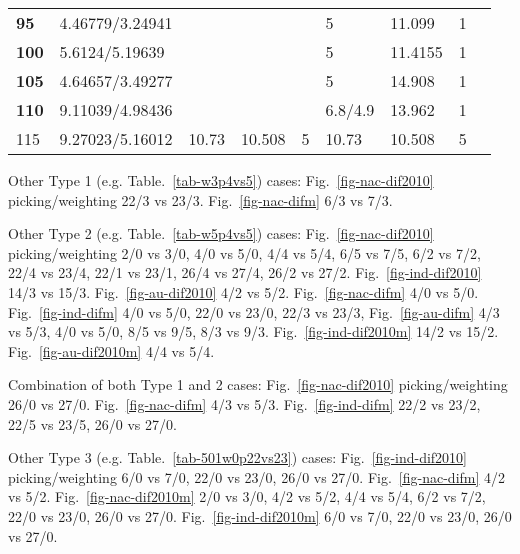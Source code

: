 \begin{table*}
\begin{tabular}{|l|l|l|l|l|l|l|l|l|l}
\textbf{95} & 4.46779/3.24941 & \multicolumn{3}{l|}{} & 5 & 11.099 & 1 & \multicolumn{2}{l|}{} \\ \cline{1-2} \cline{6-8}
\textbf{100} & 5.6124/5.19639 & \multicolumn{3}{l|}{} & 5 & 11.4155 & 1 & \multicolumn{2}{l|}{} \\ \cline{1-2} \cline{6-8}
\textbf{105} & 4.64657/3.49277 & \multicolumn{3}{l|}{} & 5 & 14.908 & 1 & \multicolumn{2}{l|}{} \\ \cline{1-2} \cline{6-8}
\textbf{110} & 9.11039/4.98436 & \multicolumn{3}{l|}{} & 6.8/4.9 & 13.962 & 1 & \multicolumn{2}{l|}{} \\ \cline{1-8}
115 & 9.27023/5.16012 & 10.73 & 10.508 & 5 & 10.73 & 10.508 & 5 & \multicolumn{2}{l|}{} \\ \cline{1-8}
\end{tabular}
\end{table*}

Other Type 1 (e.g. Table.~\ref{tab-w3p4vs5}) cases: Fig.~\ref{fig-nac-dif2010}
picking/weighting 22/3 vs 23/3. Fig.~\ref{fig-nac-difm} 6/3 vs 7/3.

Other Type 2 (e.g. Table.~\ref{tab-w5p4vs5}) cases: Fig.~\ref{fig-nac-dif2010}
picking/weighting 2/0 vs 3/0, 4/0 vs
5/0, 4/4 vs 5/4, 6/5 vs 7/5, 6/2 vs 7/2,
22/4 vs 23/4, 22/1 vs 23/1, 26/4 vs 27/4, 26/2 vs 27/2.
Fig.~\ref{fig-ind-dif2010} 14/3 vs 15/3. Fig.~\ref{fig-au-dif2010} 4/2 vs 5/2.
Fig.~\ref{fig-nac-difm} 4/0 vs 5/0.
Fig.~\ref{fig-ind-difm} 4/0 vs 5/0, 22/0 vs
23/0, 22/3 vs 23/3, Fig.~\ref{fig-au-difm}
4/3 vs 5/3, 4/0 vs 5/0, 8/5 vs 9/5, 8/3 vs 9/3. Fig.~\ref{fig-ind-dif2010m}
14/2 vs 15/2. Fig.~\ref{fig-au-dif2010m} 4/4 vs 5/4.

Combination of both Type 1 and 2 cases: Fig.~\ref{fig-nac-dif2010}
picking/weighting 26/0 vs 27/0. Fig.~\ref{fig-nac-difm}
4/3 vs 5/3. Fig.~\ref{fig-ind-difm} 22/2 vs 23/2, 22/5 vs 23/5, 26/0
vs 27/0.

Other Type 3 (e.g. Table.~\ref{tab-501w0p22vs23}) cases: Fig.~\ref{fig-ind-dif2010}
picking/weighting 6/0 vs 7/0, 22/0 vs
23/0, 26/0 vs 27/0. Fig.~\ref{fig-nac-difm}
4/2 vs 5/2. Fig.~\ref{fig-nac-dif2010m} 2/0
vs 3/0, 4/2 vs 5/2, 4/4 vs 5/4, 6/2 vs 7/2, 22/0 vs
23/0, 26/0 vs 27/0.
Fig.~\ref{fig-ind-dif2010m} 6/0 vs 7/0, 22/0
vs 23/0, 26/0 vs 27/0.


